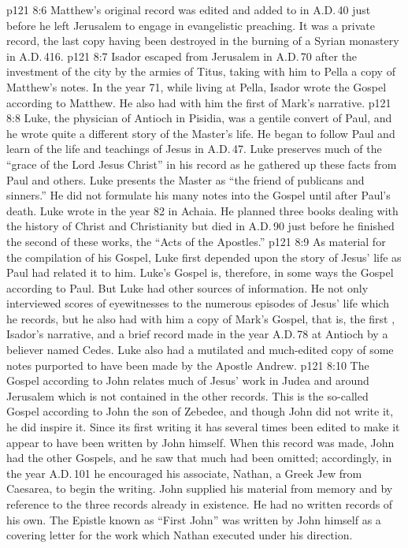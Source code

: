 \vs p121 8:6 Matthew’s original record was edited and added to in A.D.\,40 just before he left Jerusalem to engage in evangelistic preaching. It was a private record, the last copy having been destroyed in the burning of a Syrian monastery in A.D.\,416.
\vs p121 8:7 Isador escaped from Jerusalem in A.D.\,70 after the investment of the city by the armies of Titus, taking with him to Pella a copy of Matthew’s notes. In the year 71, while living at Pella, Isador wrote the Gospel according to Matthew. He also had with him the first  of Mark’s narrative.
\vs p121 8:8 \bibnobreakspace {} Luke, the physician of Antioch in Pisidia, was a gentile convert of Paul, and he wrote quite a different story of the Master’s life. He began to follow Paul and learn of the life and teachings of Jesus in A.D.\,47. Luke preserves much of the “grace of the Lord Jesus Christ” in his record as he gathered up these facts from Paul and others. Luke presents the Master as “the friend of publicans and sinners.” He did not formulate his many notes into the Gospel until after Paul’s death. Luke wrote in the year 82 in Achaia. He planned three books dealing with the history of Christ and Christianity but died in A.D.\,90 just before he finished the second of these works, the “Acts of the Apostles.”
\vs p121 8:9 As material for the compilation of his Gospel, Luke first depended upon the story of Jesus’ life as Paul had related it to him. Luke’s Gospel is, therefore, in some ways the Gospel according to Paul. But Luke had other sources of information. He not only interviewed scores of eyewitnesses to the numerous episodes of Jesus’ life which he records, but he also had with him a copy of Mark’s Gospel, that is, the first , Isador’s narrative, and a brief record made in the year A.D.\,78 at Antioch by a believer named Cedes. Luke also had a mutilated and much\hyp{}edited copy of some notes purported to have been made by the Apostle Andrew.
\vs p121 8:10 \bibnobreakspace {} The Gospel according to John relates much of Jesus’ work in Judea and around Jerusalem which is not contained in the other records. This is the so\hyp{}called Gospel according to John the son of Zebedee, and though John did not write it, he did inspire it. Since its first writing it has several times been edited to make it appear to have been written by John himself. When this record was made, John had the other Gospels, and he saw that much had been omitted; accordingly, in the year A.D.\,101 he encouraged his associate, Nathan, a Greek Jew from Caesarea, to begin the writing. John supplied his material from memory and by reference to the three records already in existence. He had no written records of his own. The Epistle known as “First John” was written by John himself as a covering letter for the work which Nathan executed under his direction.
